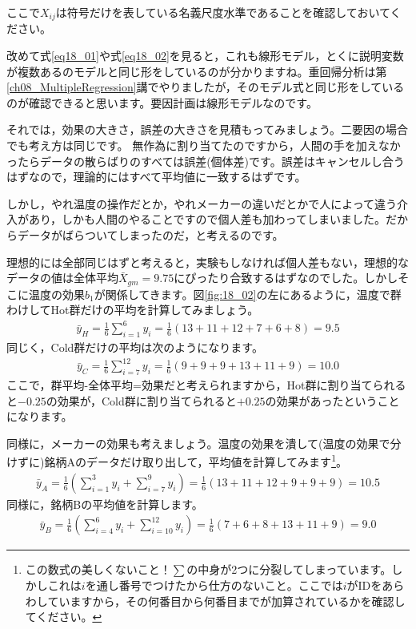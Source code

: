 \documentclass{ltjbook}
\begin{document}
ここで$X_{ij}$は符号だけを表している名義尺度水準であることを確認しておいてください。

改めて式\ref{eq18_01}や式\ref{eq18_02}を見ると，これも線形モデル，とくに説明変数が複数あるのモデルと同じ形をしているのが分かりますね。重回帰分析は第\ref{ch08_MultipleRegression}講でやりましたが，そのモデル式と同じ形をしているのが確認できると思います。要因計画は線形モデルなのです。



それでは，効果の大きさ，誤差の大きさを見積もってみましょう。二要因の場合でも考え方は同じです。
無作為に割り当てたのですから，人間の手を加えなかったらデータの散らばりのすべては誤差(個体差)です。誤差はキャンセルし合うはずなので，理論的にはすべて平均値に一致するはずです。

しかし，やれ温度の操作だとか，やれメーカーの違いだとかで人によって違う介入があり，しかも人間のやることですので個人差も加わってしまいました。だからデータがばらついてしまったのだ，と考えるのです。

理想的には全部同じはずと考えると，実験もしなければ個人差もない，理想的なデータの値は全体平均$\bar{X}_{gm} = 9.75$にぴったり合致するはずなのでした。しかしそこに温度の効果$b_1$が関係してきます。図\ref{fig:18_02}の左にあるように，温度で群わけしてHot群だけの平均を計算してみましょう。
\begin{align}
\bar{y}_{H} = \frac{1}{6}\sum_{i=1}^6 y_i = \frac{1}{6} (13+11+12+7+6+8)= 9.5
\end{align}
同じく，Cold群だけの平均は次のようになります。
\begin{align}
\bar{y}_{C} = \frac{1}{6}\sum_{i=7}^{12}y_i = \frac{1}{6}(9+9+9+13+11+9) = 10.0
\end{align}
ここで，群平均-全体平均=効果だと考えられますから，Hot群に割り当てられると$-0.25$の効果が，Cold群に割り当てられると$+0.25$の効果があったということになります。

同様に，メーカーの効果も考えましょう。温度の効果を潰して(温度の効果で分けずに)銘柄Aのデータだけ取り出して，平均値を計算してみます\footnote{この数式の美しくないこと！$\sum$の中身が2つに分裂してしまっています。しかしこれは$i$を通し番号でつけたから仕方のないこと。ここでは$i$がIDをあらわしていますから，その何番目から何番目までが加算されているかを確認してください。}。
\begin{align}
\bar{y}_{A} = \frac{1}{6}\left(\sum_{i=1}^3y_{i} + \sum_{i=7}^9y_i \right)= \frac{1}{6}(13+11+12+9+9+9) = 10.5
\end{align}
同様に，銘柄Bの平均値を計算します。
\begin{align}
\bar{y}_{B} = \frac{1}{6}\left(\sum_{i=4}^6y_i + \sum_{i=10}^{12}y_i \right) =\frac{1}{6}(7+6+8+13+11+9)= 9.0
\end{align}
\end{document}
